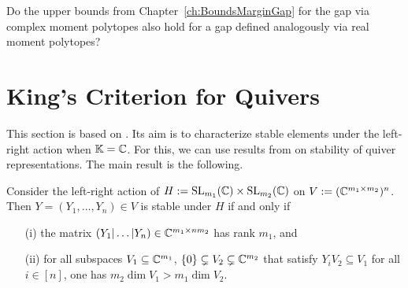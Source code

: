 \begin{question}
	Do the upper bounds from Chapter~\ref{ch:BoundsMarginGap} for the gap via complex moment polytopes
	also hold for a gap defined analogously via real moment polytopes?
\end{question} %








\section{King's Criterion for Quivers}\label{sec:King}

This section is based on \cite[Appendix~A]{SiagaPaper}. Its aim is to characterize stable elements under the left-right action when $\mathbb K = \mathbb C$. For this, we can use results from \cite{King} on stability of quiver representations.
The main result is the following.


\begin{theorem}\label{thm:KingStability}	
	Consider the left-right action of $H := \operatorname{SL}_{m_1}(\mathbb C) \times \operatorname{SL}_{m_2}(\mathbb C)$ on $V:= (\mathbb C^{m_1 \times m_2})^n$.
	Then $Y = (Y_1,\ldots,Y_n) \in V$ is stable under $H$ if and only if 
	\begin{itemize}
		\item[(i)] the matrix $(Y_1 | \ldots | Y_n) \in \mathbb C^{m_1 \times n m_2}$ has rank $m_1$, and
		\item[(ii)] for all subspaces  $V_1 \subseteq \mathbb C^{m_1}$, $\lbrace 0 \rbrace \subsetneq V_2 \subsetneq \mathbb C^{m_2}$ that satisfy $Y_i V_2 \subseteq V_1$ for all $i \in [n]$, one has $m_2 \dim V_1 > m_1 \dim V_2$.
	\end{itemize}
\end{theorem}

